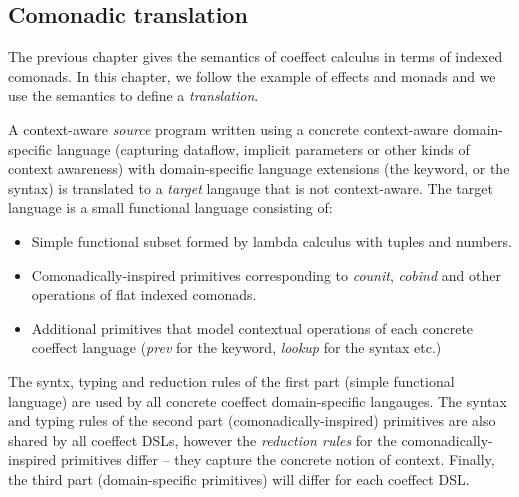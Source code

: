 
\subsection{Comonadic translation}

The previous chapter gives the semantics of coeffect calculus in terms of indexed comonads. In this
chapter, we follow the example of effects and monads and we use the semantics to define a 
\emph{translation}.

A context-aware \emph{source} program written using a concrete context-aware domain-specific 
language (capturing dataflow, implicit parameters or other kinds of context awareness) with
domain-specific language extensions (the  keyword, or the  syntax)
is translated to a \emph{target} langauge that is not context-aware. The target language is
a small functional language consisting of:
%
\begin{itemize}
  \item Simple functional subset formed by lambda calculus with tuples and numbers.
  \item Comonadically-inspired primitives corresponding to \emph{counit}, \emph{cobind} and
    other operations of flat indexed comonads.
  \item Additional primitives that model contextual operations of each concrete coeffect language
    (\emph{prev} for the  keyword, \emph{lookup} for the  syntax etc.)
\end{itemize}
%
The syntx, typing and reduction rules of the first part (simple functional language) are used by 
all concrete coeffect domain-specific langauges. The syntax and typing rules of the second part 
(comonadically-inspired) primitives are also shared by all coeffect DSLs, however the \emph{reduction
rules} for the comonadically-inspired primitives differ -- they capture the concrete notion of
context. Finally, the third part (domain-specific primitives) will differ for each coeffect DSL.



